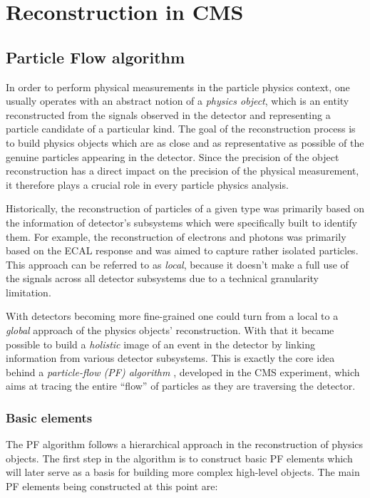 \section{Reconstruction in CMS}
\subsection{Particle Flow algorithm} \label{pf}
In order to perform physical measurements in the particle physics context, one usually operates with an abstract notion of a \textit{physics object}, which is an entity reconstructed from the signals observed in the detector and representing a particle candidate of a particular kind. The goal of the reconstruction process is to build physics objects which are as close and as representative as possible of the genuine particles appearing in the detector. Since the precision of the object reconstruction has a direct impact on the precision of the physical measurement, it therefore plays a crucial role in every particle physics analysis.

Historically, the reconstruction of particles of a given type was primarily based on the information of detector’s subsystems which were specifically built to identify them. For example, the reconstruction of electrons and photons was primarily based on the ECAL response and was aimed to capture rather isolated particles. This approach can be referred to as \textit{local}, because it doesn’t make a full use of the signals across all detector subsystems due to a technical granularity limitation. 

With detectors becoming more fine-grained one could turn from a local to a \textit{global} approach of the physics objects’ reconstruction. With that it became possible to build a \textit{holistic} image of an event in the detector by linking information from various detector subsystems. This is exactly the core idea behind a \textit{particle-flow (PF) algorithm} \cite{CMS:2017yfk}, developed in the CMS experiment, which aims at tracing the entire \enquote{flow} of particles as they are traversing the detector.

\subsubsection{Basic elements}\label{sec:pf_base}
The PF algorithm follows a hierarchical approach in the reconstruction of physics objects. The first step in the algorithm is to construct basic PF elements which will later serve as a basis for building more complex high-level objects. The main PF elements being constructed at this point are:

